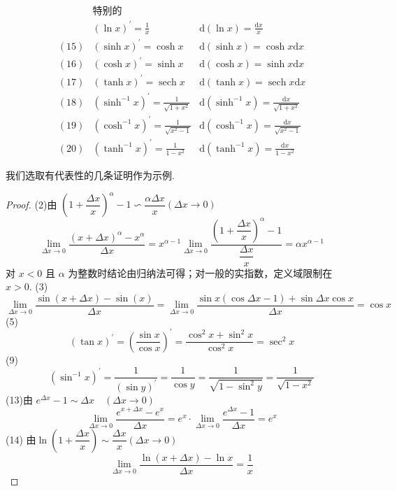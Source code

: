 \begin{theorem}
$$\begin{aligned}
		&\text{特别的}&\\
		&(\ln x)^{\prime}=\frac{1}{x}&\mathrm{d}(\ln x)=\frac{\mathrm{d} x}{x}\\
		(15)&(\sinh x)^{\prime}=\cosh x& \mathrm{d}(\sinh x)=\cosh x \mathrm{d} x\\
		(16)&(\cosh x)^{\prime}=\sinh x &\mathrm{d}(\cosh x)=\sinh x \mathrm{d} x\\
		(17)&(\tanh x)^{\prime}=\operatorname{sech} x&\mathrm{d}(\tanh x)=\operatorname{sech} x \mathrm{d}x\\
		(18)&\left(\sinh ^{-1} x\right)^{\prime}=\frac{1}{\sqrt{1+x^2}}&\mathrm{d}\left(\sinh ^{-1} x\right)=\frac{\mathrm{d} x}{\sqrt{1+x^2}}\\
		(19)&\left(\cosh ^{-1} x\right)^{\prime}=\frac{1}{\sqrt{x^2-1}}&\mathrm{d}\left(\cosh ^{-1} x\right)=\frac{\mathrm{d} x}{\sqrt{x^2-1}}\\
		(20)&\left(\tanh ^{-1} x\right)^{\prime}=\frac{1}{1-x^2}&\mathrm{d}\left(\tanh ^{-1} x\right)=\frac{\mathrm{d} x}{1-x^2}
	\end{aligned}$$
	
\end{theorem}
我们选取有代表性的几条证明作为示例.
\begin{proof}
	(2)由 $\left(1+\dfrac{\Delta x}{x}\right)^\alpha-1 \backsim \dfrac{\alpha \Delta x}{x}(\Delta x \rightarrow 0)$
	$$\lim _{\Delta x \rightarrow 0} \dfrac{(x+\Delta x)^\alpha-x^\alpha}{\Delta x}=x^{\alpha-1} \lim _{\Delta x \rightarrow 0} \frac{\left(1+\dfrac{\Delta x}{x}\right)^\alpha-1}{\dfrac{\Delta x}{x}}=\alpha x^{\alpha-1}$$
	对 $x<0$ 且 $\alpha$ 为整数时结论由归纳法可得；对一般的实指数，定义域限制在 $x>0$.
	(3)$$\lim _{\Delta x \rightarrow 0} \frac{\sin (x+\Delta x)-\sin (x)}{\Delta x}=\lim _{\Delta x \rightarrow 0} \frac{\sin x(\cos \Delta x-1)+\sin \Delta x \cos x}{\Delta x}=\cos x $$
	(5)$$(\tan x)^{\prime}=\left(\frac{\sin x}{\cos x}\right)^{\prime}=\frac{\cos ^2 x+\sin ^2 x}{\cos ^2 x}=\sec ^2 x $$
	(9) $$\left(\sin ^{-1} x\right)^{\prime}=\frac{1}{(\sin y)^{\prime}}=\frac{1}{\cos y}=\frac{1}{\sqrt{1-\sin ^2 y}}=\frac{1}{\sqrt{1-x^2}}$$
	(13)由 $e^{\Delta x}-1 \sim \Delta x \quad(\Delta x \rightarrow 0)$
	$$\lim _{\Delta x \rightarrow 0} \frac{e^{x+\Delta x}-e^x}{\Delta x}=e^x \cdot \lim _{\Delta x \rightarrow 0} \frac{e^{\Delta x}-1}{\Delta x}=e^x $$
	(14) 由$ \ln \left(1+\dfrac{\Delta x}{x}\right) \sim \dfrac{\Delta x}{x}(\Delta x \rightarrow 0)$
	$$\lim _{\Delta x \rightarrow 0} \dfrac{\ln (x+\Delta x)-\ln x}{\Delta x}=\dfrac{1}{x}$$
\end{proof}
